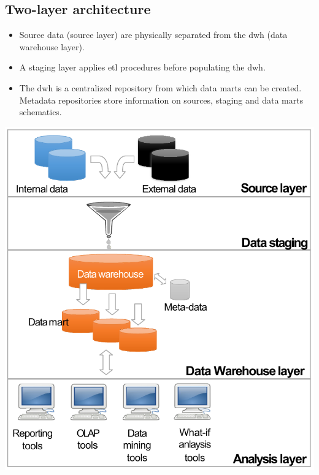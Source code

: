 \subsection{Two-layer architecture}
\begin{minipage}{0.55\textwidth}
    \begin{itemize}
        \item Source data (source layer) are physically separated from the \ac{dwh} (data warehouse layer).
        \item A staging layer applies \ac{etl} procedures before populating the \ac{dwh}.
        \item The \ac{dwh} is a centralized repository from which data marts can be created.
            Metadata repositories store information on sources, staging and data marts schematics.
    \end{itemize}
\end{minipage}
\hfill
\begin{minipage}{0.4\textwidth}
    \centering
    \includegraphics[width=\linewidth]{img/_2layer_dwh.pdf}
\end{minipage}


